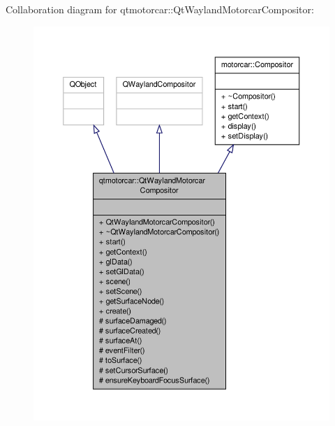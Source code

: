 Collaboration diagram for qtmotorcar\-:\-:Qt\-Wayland\-Motorcar\-Compositor\-:
\nopagebreak
\begin{figure}[H]
\begin{center}
\leavevmode
\includegraphics[width=350pt]{classqtmotorcar_1_1QtWaylandMotorcarCompositor__coll__graph}
\end{center}
\end{figure}
